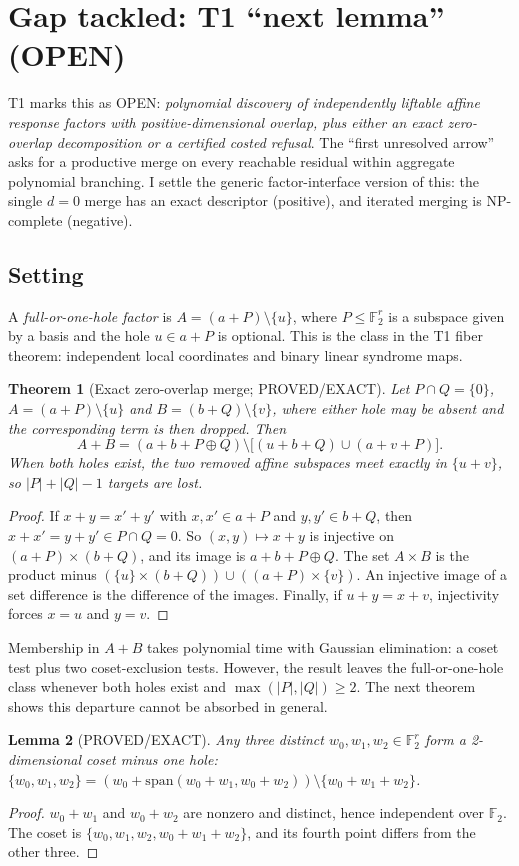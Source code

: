 \documentclass[11pt]{article}
\newtheorem{theorem}{Theorem}
\newtheorem{lemma}[theorem]{Lemma}
\newcommand{\F}{\mathbb{F}_2}
\begin{document}
\section{Gap tackled: T1 ``next lemma'' (OPEN)}
T1 marks this as OPEN: \emph{polynomial discovery of independently liftable affine response factors with positive-dimensional overlap, plus either an exact zero-overlap decomposition or a certified costed refusal}. The ``first unresolved arrow'' asks for a productive merge on every reachable residual within aggregate polynomial branching. I settle the generic factor-interface version of this: the single $d=0$ merge has an exact descriptor (positive), and iterated merging is NP-complete (negative).

\subsection*{Setting}
A \emph{full-or-one-hole factor} is $A=(a+P)\setminus\{u\}$, where $P\le\F^r$ is a subspace given by a basis and the hole $u\in a+P$ is optional. This is the class in the T1 fiber theorem: independent local coordinates and binary linear syndrome maps.

\begin{theorem}[Exact zero-overlap merge; PROVED/EXACT]
Let $P\cap Q=\{0\}$, $A=(a+P)\setminus\{u\}$ and $B=(b+Q)\setminus\{v\}$, where either hole may be absent and the corresponding term is then dropped. Then
\[A+B=(a+b+P\oplus Q)\setminus\big[(u+b+Q)\cup(a+v+P)\big].\]
When both holes exist, the two removed affine subspaces meet exactly in $\{u+v\}$, so $|P|+|Q|-1$ targets are lost.
\end{theorem}
\begin{proof}
If $x+y=x'+y'$ with $x,x'\in a+P$ and $y,y'\in b+Q$, then $x+x'=y+y'\in P\cap Q=0$. So $(x,y)\mapsto x+y$ is injective on $(a+P)\times(b+Q)$, and its image is $a+b+P\oplus Q$. The set $A\times B$ is the product minus $(\{u\}\times(b+Q))\cup((a+P)\times\{v\})$. An injective image of a set difference is the difference of the images. Finally, if $u+y=x+v$, injectivity forces $x=u$ and $y=v$.
\end{proof}
\noindent Membership in $A+B$ takes polynomial time with Gaussian elimination: a coset test plus two coset-exclusion tests. However, the result leaves the full-or-one-hole class whenever both holes exist and $\max(|P|,|Q|)\ge2$. The next theorem shows this departure cannot be absorbed in general.

\begin{lemma}[PROVED/EXACT]
Any three distinct $w_0,w_1,w_2\in\F^r$ form a 2-dimensional coset minus one hole: $\{w_0,w_1,w_2\}=(w_0+\mathrm{span}(w_0{+}w_1,w_0{+}w_2))\setminus\{w_0{+}w_1{+}w_2\}$.
\end{lemma}
\begin{proof}
$w_0+w_1$ and $w_0+w_2$ are nonzero and distinct, hence independent over $\F$. The coset is $\{w_0,w_1,w_2,w_0+w_1+w_2\}$, and its fourth point differs from the other three.
\end{proof}
\end{document}
